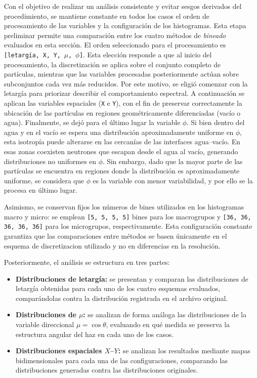 Con el objetivo de realizar un análisis consistente y evitar sesgos derivados del procedimiento, se mantiene constante en todos los casos el orden de procesamiento de las variables y la configuración de los histogramas. Esta etapa preliminar permite una comparación entre los cuatro métodos de \textit{bineado} evaluados en esta sección. El orden seleccionado para el procesamiento es \texttt{[letargía, X, Y, $\mu$, $\phi$]}. Esta elección responde a que al inicio del procesamiento, la discretización se aplica sobre el conjunto completo de partículas, mientras que las variables procesadas posteriormente actúan sobre subconjuntos cada vez más reducidos. Por este motivo, se eligió comenzar con la letargía para priorizar describir el comportamiento espectral. A continuación se aplican las variables espaciales (\texttt{X} e \texttt{Y}), con el fin de preservar correctamente la ubicación de las partículas en regiones geométricamente diferenciadas (vacío o agua). Finalmente, se dejó para el último lugar la variable \texttt{$\phi$}. Si bien dentro del agua y en el vacío se espera una distribución aproximadamente uniforme en $\phi$, esta isotropía puede alterarse en las cercanías de las interfaces agua–vacío. En esas zonas coexisten neutrones que escapan desde el agua al vacío, generando distribuciones no uniformes en $\phi$. Sin embargo, dado que la mayor parte de las partículas se encuentra en regiones donde la distribución es aproximadamente uniforme, se considera que $\phi$ es la variable con menor variabilidad, y por ello se la procesa en último lugar.

Asimismo, se conservan fijos los números de bines utilizados en los histogramas macro y micro: se emplean \texttt{[5, 5, 5, 5]} bines para los macrogrupos y \texttt{[36, 36, 36, 36, 36]} para los microgrupos, respectivamente. Esta configuración constante garantiza que las comparaciones entre métodos se basen únicamente en el esquema de discretizacion utilizado y no en diferencias en la resolución.

Posteriormente, el análisis se estructura en tres partes:

\begin{itemize}
\item \textbf{Distribuciones de letargía:} se presentan y comparan las distribuciones de letargía obtenidas para cada uno de los cuatro esquemas evaluados, comparándolas contra la distribución registrada en el archivo original.
\item \textbf{Distribuciones de $\mu$:} se analizan de forma análoga las distribuciones de la variable direccional $\mu = \cos\theta$, evaluando en qué medida se preserva la estructura angular del haz en cada uno de los casos.

\item \textbf{Distribuciones espaciales $X$–$Y$:} se analizan los resultados mediante mapas bidimensionales para cada una de las configuraciones, comparando las distribuciones generadas contra las distribuciones originales.
\end{itemize}

